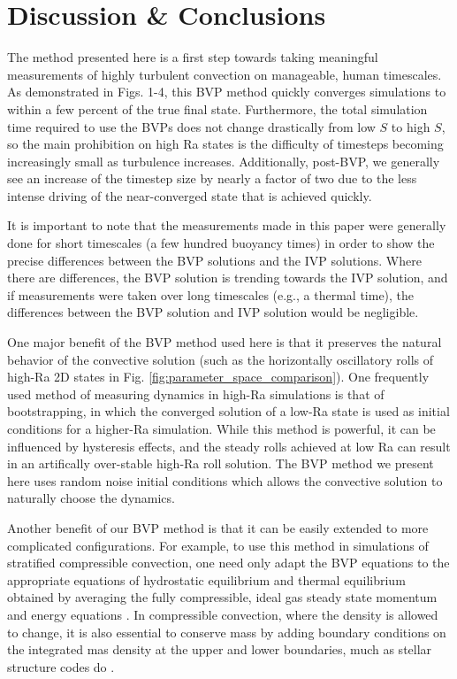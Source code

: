 \documentclass[aps, pre, onecolumn, nofootinbib, notitlepage, groupedaddress, amsfonts, amssymb, amsmath, longbibliography]{revtex4-1}
\begin{document}
\section{Discussion \& Conclusions}
\label{sec:results}
The method presented here is a first step towards taking meaningful measurements
of highly turbulent convection on manageable, human timescales.  As demonstrated in Figs.
1-4, this BVP method quickly converges simulations to within a few percent of the true final
state. Furthermore, the total simulation time required to use the BVPs does not change drastically from
low $S$ to high $S$, so the main prohibition on high Ra states is the difficulty of timesteps becoming
increasingly small as turbulence increases.  Additionally, post-BVP, we generally see an increase of the
timestep size by nearly a factor of two due to the less intense driving of the near-converged state that
is achieved quickly.  

It is important to note that the measurements made in
this paper were generally done for short timescales (a few hundred buoyancy times) in
order to show the precise differences between the BVP solutions and the IVP solutions.
Where there are differences, the BVP solution is trending towards the IVP solution,
and if measurements were taken over long timescales (e.g., a thermal time), the
differences between the BVP solution and IVP solution would be negligible.

One major benefit of the BVP method used here is that it preserves the natural behavior of 
the convective solution (such as the horizontally oscillatory rolls
of high-Ra 2D states in Fig. \ref{fig:parameter_space_comparison}).
One frequently used method of measuring dynamics in high-Ra simulations is that of bootstrapping,
in which the converged solution of a low-Ra state is used as initial conditions for a higher-Ra
simulation.  While this method is powerful, it can be influenced by hysteresis effects,
and the steady rolls achieved at low Ra can result in an artifically over-stable high-Ra
roll solution.  The BVP method we present here uses random noise initial conditions which allows the
convective solution to naturally choose the dynamics.

Another benefit of our BVP method is that it can be easily extended to more complicated
configurations.  For example, to use this method in simulations of stratified compressible convection,
one need only adapt the BVP equations to the appropriate equations of hydrostatic equilibrium
and thermal equilibrium obtained by averaging the fully compressible, ideal gas
steady state momentum and energy equations \cite{anders&brown2017, lecoanet&all2014}.
In compressible convection, where the density is allowed to change,
it is also essential to conserve mass by adding boundary conditions on the integrated mas density at
the upper and lower boundaries, much as stellar structure codes do \cite{paxton&all2011}.
\end{document}
